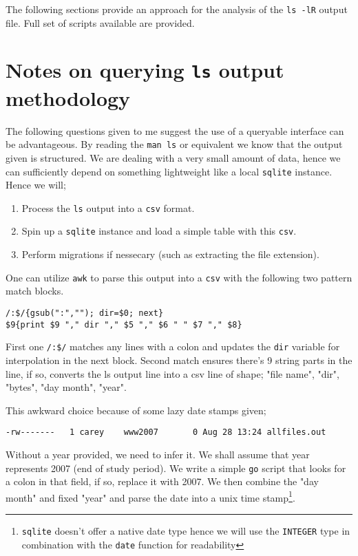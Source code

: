 \documentclass{article}
\begin{document}
\newpage
The following sections provide an approach for the analysis of the \texttt{ls -lR} output file. Full set of scripts available are provided.
\section*{Notes on querying \texttt{ls} output methodology}
The following questions given to me suggest the use of a queryable interface can be advantageous. By reading the \texttt{man ls} or equivalent we know that the output given is structured. We are dealing with a very small amount of data, hence we can sufficiently depend on something lightweight like a local \texttt{sqlite} instance. Hence we will;

\begin{enumerate}
				\item Process the \texttt{ls} output into a \texttt{csv} format.
				\item Spin up a \texttt{sqlite} instance and load a simple table with this \texttt{csv}.
				\item Perform migrations if nessecary (such as extracting the file extension).
\end{enumerate}

One can utilize \texttt{awk} to parse this output into a \texttt{csv} with the following two pattern match blocks.
\begin{verbatim}
/:$/{gsub(":",""); dir=$0; next}
$9{print $9 "," dir "," $5 "," $6 " " $7 "," $8}
\end{verbatim}

First one \texttt{/:\$/} matches any lines with a colon and updates the \texttt{dir} variable for interpolation in the next block. Second match ensures there's 9 string parts in the line, if so, converts the ls output line into a csv line of shape; "file name", "dir", "bytes", "day month", "year".

This awkward choice because of some lazy date stamps given;
\begin{verbatim}
-rw-------   1 carey    www2007       0 Aug 28 13:24 allfiles.out
\end{verbatim}
Without a year provided, we need to infer it. We shall assume that year represents 2007 (end of study period). We write a simple \texttt{go} script that looks for a colon in that field, if so, replace it with 2007. We then combine the "day month" and fixed "year" and parse the date into a unix time stamp\footnote{\texttt{sqlite} doesn't offer a native date type hence we will use the \texttt{INTEGER} type in combination with the \texttt{date} function for readability}.
\end{document}
